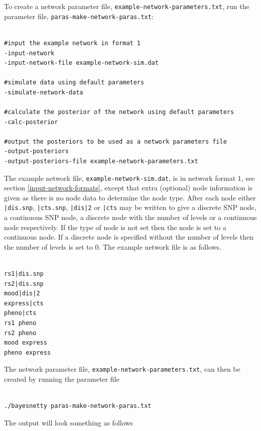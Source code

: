 \documentclass[a4paper,12pt]{article}
\newcommand{\code}[1]{{\footnotesize{{\tt #1}}}}
\begin{document}
To create a network parameter file, \code{example-network-parameters.txt}, run the parameter file, \code{paras-make-network-paras.txt}: 
\vspace{0.35cm} \begin{lstlisting}

#input the example network in format 1
-input-network
-input-network-file example-network-sim.dat

#simulate data using default parameters
-simulate-network-data

#calculate the posterior of the network using default parameters
-calc-posterior

#output the posteriors to be used as a network parameters file
-output-posteriors
-output-posteriors-file example-network-parameters.txt

\end{lstlisting} \vspace{0.35cm}
The example network file, \code{example-network-sim.dat}, is in network format 1, see  section \ref{input-network-formats}, except that extra (optional) node information is given as there is no node data to determine the node type. After each node either \code{|dis.snp}, \code{|cts.snp}, \code{|dis|2} or \code{|cts} may be written to give a discrete SNP node, a continuous SNP node, a discrete node with the number of levels or a continuous node respectively. If the type of node is not set then the node is set to a continuous node. If a discrete node is specified without the number of levels then the number of levels is set to 0. The example network file is as follows. 
\vspace{0.35cm} \begin{lstlisting}

rs1|dis.snp
rs2|dis.snp
mood|dis|2
express|cts
pheno|cts
rs1 pheno
rs2 pheno
mood express
pheno express

\end{lstlisting} \vspace{0.35cm}
The network parameter file, \code{example-network-parameters.txt}, can then be created by running the parameter file 
\vspace{0.35cm} \begin{lstlisting}

./bayesnetty paras-make-network-paras.txt

\end{lstlisting} \vspace{0.35cm}
The output will look something as follows 
\end{document}
